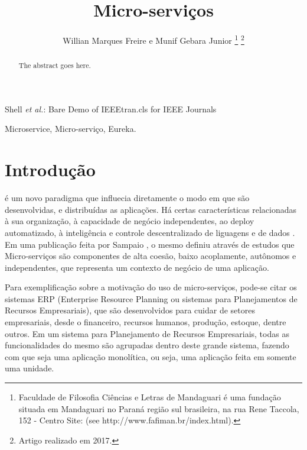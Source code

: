 \documentclass[journal]{IEEEtran}
\begin{document}
\title{Micro-serviços}

\author{Willian Marques Freire e
        Munif Gebara Junior%
\thanks{Faculdade de Filosofia Ciências e Letras de Mandaguari é uma fundação
situada em Mandaguari no Paraná região sul brasileira,
na rua Rene Taccola, 152 - Centro Site: (see http://www.fafiman.br/index.html).}%
\thanks{Artigo realizado em 2017.}}

%
{Shell \MakeLowercase{\textit{et al.}}: Bare Demo of IEEEtran.cls for IEEE Journals}

\maketitle

\begin{abstract}
The abstract goes here.
\end{abstract}

\begin{IEEEkeywords}
Microservice, Micro-serviço, Eureka.
\end{IEEEkeywords}


\IEEEpeerreviewmaketitle

\section{Introdução}

 é um novo paradigma que influecia diretamente o modo em que são desenvolvidas, e distribuídas as aplicações. Há certas características relacionadas à sua organização, à capacidade de negócio independentes, ao deploy automatizado, à inteligência e controle descentralizado de liguagens e de dados \cite{JamesLewis}. Em uma publicação feita por Sampaio \cite{CleutonSampaio}, o mesmo definiu através de estudos que Micro-serviços são componentes de alta coesão, baixo acoplamente, autônomos e independentes, que representa um contexto de negócio de uma aplicação.

Para exemplificação sobre a motivação do uso de micro-serviços, pode-se citar os sistemas ERP (Enterprise Resource Planning ou sistemas para Planejamentos de Recursos Empresariais), que são desenvolvidos para cuidar de setores empresariais, desde o financeiro, recursos humanos, produção, estoque, dentre outros. Em um sistema para Planejamento de Recursos Empresariais, todas as funcionalidades do mesmo são agrupadas dentro deste grande sistema, fazendo com que seja uma aplicação monolítica, ou seja, uma aplicação feita em somente uma unidade.
\end{document}
